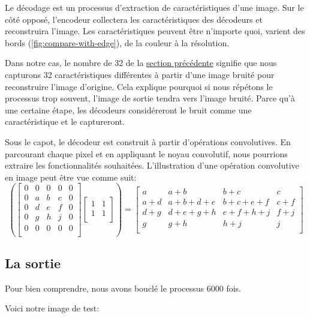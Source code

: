 \documentclass[
  12pt,
  dvipsnames]{article}
\begin{document}
Le décodage est un processus d'extraction de caractéristiques d'une image. Sur le côté opposé, l'encodeur collectera les caractéristiques des décodeurs et reconstruira l'image. Les caractéristiques peuvent être n'importe quoi, varient des bords (\ref{fig:compare-with-edge}), de la couleur à la résolution.

Dans notre cas, le nombre de 32 de la \protect\hyperlink{le-moduxe8le}{section précédente} signifie que nous capturons 32 caractéristiques différentes à partir d'une image bruité pour reconstruire l'image d'origine. Cela explique pourquoi si nous répétons le processus trop souvent, l'image de sortie tendra vers l'image bruité. Parce qu'à une certaine étape, les décodeurs considéreront le bruit comme une caractéristique et le captureront.

Sous le capot, le décodeur est construit à partir d'opérations convolutives. En parcourant chaque pixel et en appliquant le noyau convolutif, nous pourrions extraire les fonctionnalités souhaitées. L'illustration d'une opération convolutive en image peut être vue comme suit:
\[\left(\begin{bmatrix}
  0 & 0 & 0 & 0 & 0\\
  0 & a & b & c & 0\\
  0 & d & e & f & 0\\
  0 & g & h & j & 0\\
  0 & 0 & 0 & 0 & 0\\
\end{bmatrix}
\begin{bmatrix}
  1 & 1\\
  1 & 1\\
\end{bmatrix}\right) =
\begin{bmatrix}
  a & a+b & b+c & c\\
  a+d & a+b+d+e & b+c+e+f & c+f\\
  d+g & d+e+g+h & e+f+h+j & f+j\\
  g & g+h & h+j & j\\
\end{bmatrix}
\]

\hypertarget{la-sortie}{%
\subsection{La sortie}\label{la-sortie}}

Pour bien comprendre, nous avons bouclé le processus 6000 fois.

Voici notre image de test:
\end{document}
